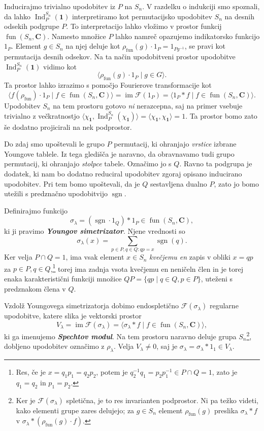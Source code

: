\documentclass[11pt]{book}
\def\CC{\mathbf{C}}
\def\11{\mathbf{1}}
\def\Fcal{\mathcal{F}}
\def\youngsym{\sigma_{\lambda}}
\DeclareMathOperator\image{im}
\DeclareMathOperator\sgn{sgn}
\DeclareMathOperator\Ind{Ind}
\DeclareMathOperator\fun{fun}
\def\definicija{\color{rdeca}\bf\em}
\theoremstyle{definition}
\theoremstyle{zgled}
\theoremstyle{odprtproblem}
\theoremstyle{domacanaloga}
\theoremstyle{izrek}
\begin{document}
Inducirajmo trivialno upodobitev iz $P$ na $S_n$. V razdelku o indukciji smo spoznali, da lahko $\Ind^{S_n}_{P}(\11)$ interpretiramo kot permutacijsko upodobitev $S_n$ na desnih odsekih podgrupe $P$. To interpretacijo lahko vložimo v prostor funkcij $\fun(S_n, \CC)$. Namesto množice $P$ lahko namreč opazujemo indikatorsko funkcijo $1_P$. Element $g \in S_n$ na njej deluje kot
$\rho_{\fun}(g) \cdot 1_P = 1_{P g^{-1}}$, se pravi kot permutacija desnih odsekov. Na ta način upodobitveni prostor upodobitve $\Ind^{S_n}_{P}(\11)$ vidimo kot 
\[
    \langle \rho_{\fun}(g) \cdot 1_{P} \mid g \in G \rangle.
\]
Ta prostor lahko izrazimo s pomočjo Fourierove transformacije kot
\[
    \langle \hat{f}(\rho_{\fun}) \cdot 1_P \mid f \in \fun(S_n, \CC) \rangle
    = \image \Fcal(1_P)
    = \langle 1_P * f \mid f \in \fun(S_n, \CC) \rangle.    
\]
Upodobitev $S_n$ na tem prostoru gotovo \emph{ni} nerazcepna, saj na primer vsebuje trivialno z večkratnostjo $\langle \chi_{\11}, \Ind^{S_n}_{P}(\chi_{\11}) \rangle = \langle \chi_{\11}, \chi_{\11} \rangle = 1$. Ta prostor bomo zato še dodatno projicirali na nek podprostor.

Do zdaj smo upoštevali le grupo $P$ permutacij, ki ohranjajo \emph{vrstice} izbrane Youngove tablele. Iz tega gledišča je naravno, da obravnavamo tudi grupo permutacij, ki ohranjajo \emph{stolpce} tabele. Označimo jo s $Q$. Ravno ta podgrupa je dodatek, ki nam bo dodatno reduciral upodobitev zgoraj opisano inducirano upodobitev. Pri tem bomo upoštevali, da je $Q$ sestavljena dualno $P$, zato jo bomo utežili s predznačno upodobitvijo $\sgn$.

Definirajmo funkcijo
\[
    \youngsym = (\sgn \cdot 1_Q) * 1_P \in \fun(S_n, \CC),
\]
ki ji pravimo {\definicija Youngov simetrizator}. Njene vrednosti so
\[
    \youngsym(x) = \sum_{p \in P, q \in Q \colon qp = x} \sgn(q).
\]
Ker velja $P \cap Q = 1$, ima vsak element $x \in S_n$ \emph{kvečjemu en} zapis v obliki $x = qp$ za $p \in P, q \in Q$,\footnote{Res, če je $x = q_1 p_1 = q_2 p_2$, potem je $q_2^{-1} q_1 = p_2 p_1^{-1} \in P \cap Q = 1$, zato je $q_1 = q_2$ in $p_1 = p_2$.} torej ima zadnja vsota kvečjemu en neničeln člen in je torej enaka karakteristični funkciji množice $QP = \{ qp \mid q \in Q, p \in P \}$, uteženi s predznakom člena v $Q$.

Vzdolž Youngovega simetrizatorja dobimo endospletično $\Fcal(\youngsym)$ regularne upodobitve, katere slika je vektorski prostor
\[
    V_{\lambda} = \image \Fcal(\youngsym) = \langle \youngsym * f \mid f \in \fun(S_n, \CC) \rangle,
\]
ki ga imenujemo {\definicija Spechtov modul}. Na tem prostoru naravno deluje grupa $S_n$\footnote{Ker je $\Fcal(\youngsym)$ spletična, je to res invarianten podprostor. Ni pa težko videti, kako elementi grupe zares delujejo; za $g \in S_n$ element $\rho_{\fun}(g)$ preslika $\youngsym * f$ v $\youngsym * (\rho_{\fun}(g) \cdot f)$.}, dobljeno upodobitev označimo z $\rho_{\lambda}$. Velja $V_{\lambda} \neq 0$, saj je $\youngsym = \youngsym * 1_1 \in V_{\lambda}$.
\end{document}
